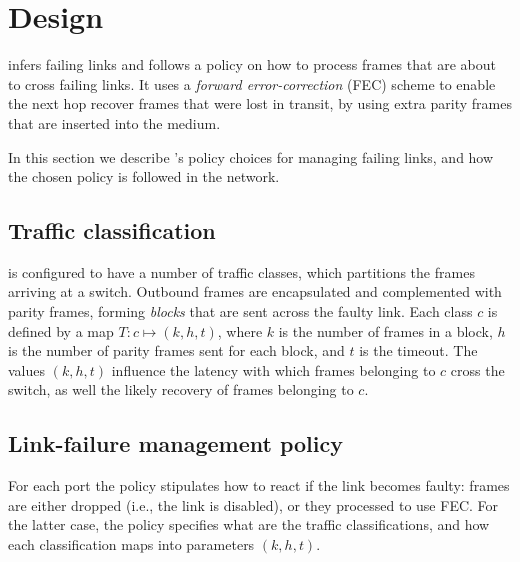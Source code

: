 \section{Design}
\label{sec:design}

\OurSys infers failing links and follows a policy on how to process
frames that are about to cross failing links. It uses a \emph{forward
error-correction} (FEC) scheme to enable the next hop recover frames that
were lost in transit, by using extra parity frames that are inserted
into the medium.

In this section we describe \OurSys's policy choices for managing failing
links, and how the chosen policy is followed in the network.


\subsection{Traffic classification}
\label{sec:traffic-classification}
\OurSys is configured to have a number of traffic classes,
which partitions the frames arriving at a switch. Outbound frames are encapsulated and
complemented with parity frames, forming \emph{blocks} that are sent across
the faulty link.
Each class $c$ is defined by a map $T: c \mapsto (k, h, t)$, where $k$ is the
number of frames in a block, $h$ is the number of parity frames sent for each
block, and $t$ is the timeout.
The values $(k, h, t)$ influence the latency with which frames belonging to $c$
cross the switch, as well the likely recovery of frames belonging to $c$.


\subsection{Link-failure management policy}
\label{sec:policy}
For each port the policy stipulates how to react if the link becomes faulty: frames are either dropped (i.e., the link is disabled), or they processed to use FEC.
For the latter case, the policy specifies what are the traffic classifications,
and how each classification maps into parameters $(k, h, t)$.
%


